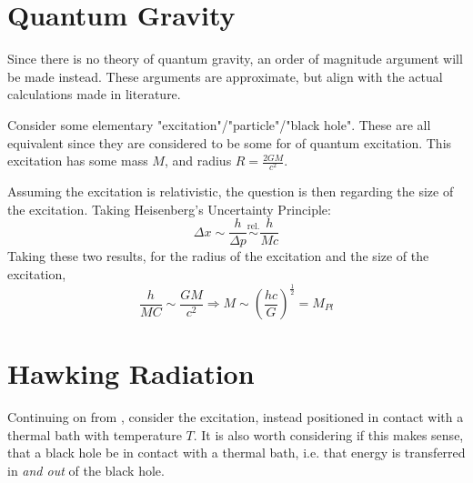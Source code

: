 \section{Quantum Gravity}
Since there is no theory of quantum gravity, an order of magnitude argument will be made instead. These arguments are approximate, but align with the actual calculations made in literature. \par Consider some elementary "excitation"/"particle"/"black hole". These are all equivalent since they are considered to be some for of quantum excitation. This excitation has some mass $M$, and radius $R = \frac{2GM}{c^2}$. \par Assuming the excitation is relativistic, the question is then regarding the size of the excitation. Taking Heisenberg's Uncertainty Principle:
$$ \Delta x \sim \frac{h}{\Delta p} \overset{\text{rel.}}{\sim} \frac{h}{Mc}  $$ 
Taking these two results, for the radius of the excitation and the size of the excitation, 
$$ \frac{h}{MC} \sim \frac{GM}{c^2} \Rightarrow M \sim \left(\frac{hc}{G}\right)^{\frac{1}{2}} = M_{Pl}$$

\section{Hawking Radiation}
Continuing on from , consider the excitation, instead positioned in contact with a thermal bath with temperature $T$. It is also worth considering if this makes sense, that a black hole be in contact with a thermal bath, i.e. that energy is transferred in \textit{and out} of the black hole.

